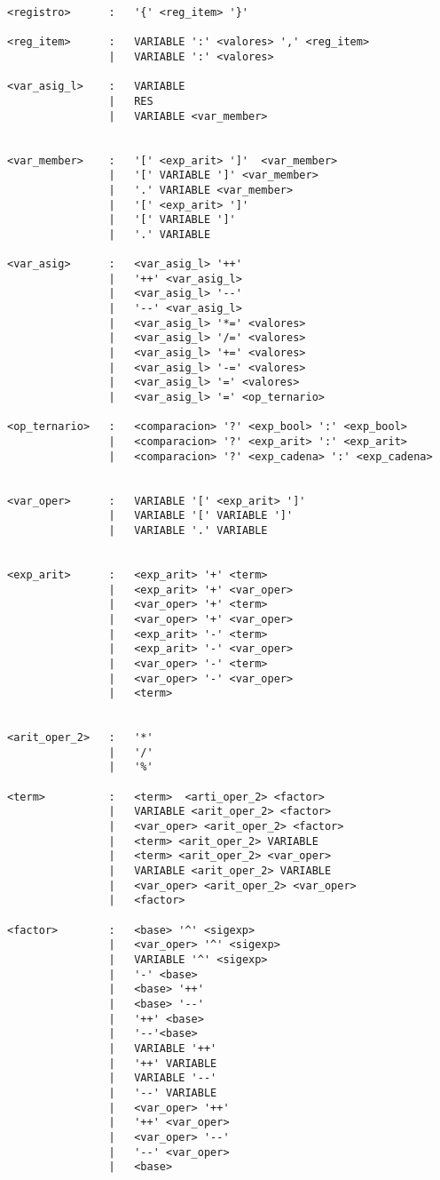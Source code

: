 \begin{verbatim}
<registro>      :   '{' <reg_item> '}'

<reg_item>      :   VARIABLE ':' <valores> ',' <reg_item>
                |   VARIABLE ':' <valores> 

<var_asig_l>    :   VARIABLE
                |   RES
                |   VARIABLE <var_member>


<var_member>    :   '[' <exp_arit> ']'  <var_member>
                |   '[' VARIABLE ']' <var_member>
                |   '.' VARIABLE <var_member>
                |   '[' <exp_arit> ']' 
                |   '[' VARIABLE ']' 
                |   '.' VARIABLE 

<var_asig>      :   <var_asig_l> '++'
                |   '++' <var_asig_l>
                |   <var_asig_l> '--'
                |   '--' <var_asig_l>
                |   <var_asig_l> '*=' <valores>
                |   <var_asig_l> '/=' <valores>
                |   <var_asig_l> '+=' <valores>
                |   <var_asig_l> '-=' <valores>
                |   <var_asig_l> '=' <valores>
                |   <var_asig_l> '=' <op_ternario>

<op_ternario>   :   <comparacion> '?' <exp_bool> ':' <exp_bool>
                |   <comparacion> '?' <exp_arit> ':' <exp_arit>
                |   <comparacion> '?' <exp_cadena> ':' <exp_cadena>


<var_oper>      :   VARIABLE '[' <exp_arit> ']' 
                |   VARIABLE '[' VARIABLE ']' 
                |   VARIABLE '.' VARIABLE 

 
<exp_arit>      :   <exp_arit> '+' <term>
                |   <exp_arit> '+' <var_oper>
                |   <var_oper> '+' <term>
                |   <var_oper> '+' <var_oper>
                |   <exp_arit> '-' <term>
                |   <exp_arit> '-' <var_oper>
                |   <var_oper> '-' <term>
                |   <var_oper> '-' <var_oper>
                |   <term>


<arit_oper_2>   :   '*'
                |   '/'
                |   '%'

<term>          :   <term>  <arti_oper_2> <factor>
                |   VARIABLE <arit_oper_2> <factor>
                |   <var_oper> <arit_oper_2> <factor>
                |   <term> <arit_oper_2> VARIABLE
                |   <term> <arit_oper_2> <var_oper>
                |   VARIABLE <arit_oper_2> VARIABLE
                |   <var_oper> <arit_oper_2> <var_oper> 
                |   <factor>

<factor>        :   <base> '^' <sigexp>
                |   <var_oper> '^' <sigexp>
                |   VARIABLE '^' <sigexp>
                |   '-' <base>  
                |   <base> '++'
                |   <base> '--'
                |   '++' <base>
                |   '--'<base>
                |   VARIABLE '++'
                |   '++' VARIABLE
                |   VARIABLE '--'
                |   '--' VARIABLE
                |   <var_oper> '++'
                |   '++' <var_oper>
                |   <var_oper> '--'
                |   '--' <var_oper>
                |   <base>


\end{verbatim}
